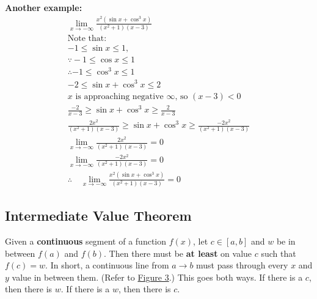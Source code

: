 \documentclass[12pt]{article}
\begin{document}
            \noindent \textbf{Another example:}
            \begin{gather*}
                \lim_{x \to -\infty} \frac{x^2(\sin{x} + \cos^{3}{x})}{(x^2+1)(x-3)} \\[8pt]
                \text{Note that:} \\
                -1 \le \sin{x} \le 1, \\
                \because -1 \le \cos{x} \le {1} \\
                \therefore -1 \le \cos^{3}{x} \le 1 \\
                -2 \le \sin{x} + \cos^{3}{x} \le 2 \\[8pt]
                \text{$x$ is approaching negative $\infty$, so $(x-3) < 0$} \\
                \frac{-2}{x-3} \ge \sin{x} + \cos^{3}{x} \ge \frac{2}{x-3} \\[6pt]
                \frac{2x^2}{(x^2+1)(x-3)} \ge \sin{x} + \cos^{3}{x} \ge \frac{-2x^2}{(x^2+1)(x-3)} \\[10pt]
                \lim_{x \to -\infty}\frac{2x^2}{(x^2+1)(x-3)} = 0 \\[6pt]
                \lim_{x \to -\infty}\frac{-2x^2}{(x^2+1)(x-3)} = 0 \\[6pt]
                \therefore \quad \lim_{x \to -\infty} \frac{x^2(\sin{x} + \cos^{3}{x})}{(x^2+1)(x-3)} = 0
            \end{gather*}

        \subsection{Intermediate Value Theorem}
            Given a \textbf{continuous} segment of a function $f(x)$, let $c \in [a, b]$ and $w$ be in between $f(a)$ and $f(b)$. Then there must be \textbf{at least} on value $c$ such that $f(c) = w$. In short, a continuous line from $a \to b$ must pass through every $x$ and $y$ value in between them. (Refer to \hyperref[fig:intvaltheorem]{Figure 3}.) This goes both ways. If there is a $c$, then there is  $w$. If there is a $w$, then there is $c$.
\end{document}
